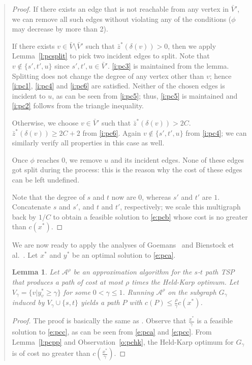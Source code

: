 \documentclass[11pt,letterpaper]{article}
\newtheorem{lemma}{Lemma}
\newcommand{\st}{\mbox{$s$-$t$} }
\begin{document}
\begin{quote}
\begin{proof}
If there exists an edge that is not reachable from any vertex in $\bar V'$, we can remove all such edges without violating any of the conditions ($\phi$ may decrease by more than 2).

If there exists $v\in\bar V\setminus\bar V'$ such that $\bar z^*(\delta(v))> 0$, then we apply Lemma~\ref{l:pcsplit} to pick two incident edges to split. Note that $v\notin\{s',t',u\}$ since $s',t',u\in \bar V'$. \eqref{i:pc3} is maintained from the lemma. Splitting does not change the degree of any vertex other than $v$; hence \eqref{i:pc1}, \eqref{i:pc4} and \eqref{i:pc6} are satisfied. Neither of the chosen edges is incident to $u$, as can be seen from \eqref{i:pc5}; thus, \eqref{i:pc5} is maintained and \eqref{i:pc2} follows from the triangle inequality.

Otherwise, we choose $v\in \bar V'$ such that $\bar z^*(\delta(v))> 2C$. $\bar z^*(\delta(v))\geq 2C+2$ from \eqref{i:pc6}. Again $v\notin\{s',t',u\}$ from \eqref{i:pc4}; we can similarly verify all properties in this case as well.

Once $\phi$ reaches $0$, we remove $u$ and its incident edges. None of these edges got split during the process: this is the reason why the cost of these edges can be left undefined.

Note that the degree of $s$ and $t$ now are $0$, whereas $s'$ and $t'$ are $1$. Concatenate $s$ and $s'$, and $t$ and $t'$, respectively; we scale this multigraph back by $1/C$ to obtain a feasible solution to \eqref{e:pcb} whose cost is no greater than $c(x^*)$.
\end{proof}

We are now ready to apply the analyses of Goemans~\cite{G:pc} and Bienstock et al.~\cite{BGSW}. Let $x^*$ and $y^*$ be an optimal solution to \eqref{e:pca}.
\begin{lemma}\label{l:prounding}
Let $\mathscr{A}^\rho$ be an approximation algorithm for the \st path TSP that produces a path of cost at most $\rho$ times the Held-Karp optimum. Let $V_\gamma=\{v|y_v^*\geq \gamma\}$ for some $0<\gamma\leq 1$. Running $\mathscr{A}^\rho$ on the subgraph $G_\gamma$ induced by $V_\gamma\cup\{s,t\}$ yields a path $P$ with $c(P)\leq\frac{\rho}{\gamma}c(x^*)$.
\end{lemma}
\begin{proof}The proof is basically the same as \cite{BGSW}. Observe that $\frac{x^*}{\gamma}$ is a feasible solution to \eqref{e:pcc}, as can be seen from \eqref{e:pca} and \eqref{e:pcc}. From Lemma~\ref{l:pcpp} and Observation~\ref{o:pchk}, the Held-Karp optimum for $G_\gamma$ is of cost no greater than $c(\frac{x^*}{\gamma})$.
\end{proof}


\end{quote}
\end{document}
